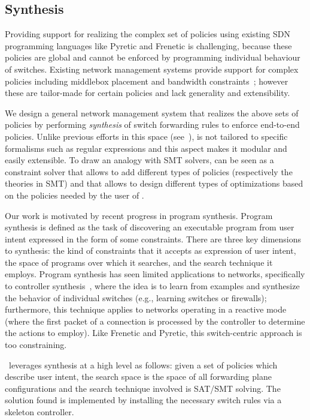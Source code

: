 \subsection{Synthesis} \label{sec:synthesis} 

Providing support for realizing the complex set of policies using
existing SDN programming languages like Pyretic and Frenetic is
challenging, because these policies are global and cannot be enforced
by programming individual behaviour of switches. Existing network
management systems provide support for complex policies including
middlebox placement and bandwidth constraints~\cite{}; however these
are tailor-made for certain policies and lack generality and
extensibility.

We design a general network management system that realizes the above
sets of policies by performing {\em synthesis} of switch forwarding
rules to enforce end-to-end policies. 
Unlike previous efforts in this space (see~\cite{}),
\Name is not tailored to 
specific formalisms such as regular expressions and
this aspect makes it modular  and easily extensible.
To draw an analogy with SMT solvers, 
\Name can be seen as a constraint solver
that allows to add different types of policies (respectively the theories in SMT) and
that allows to design different types of optimizations based on the 
policies needed by the user of \Name.

Our work is motivated by recent
progress in program synthesis.  
Program synthesis is defined as the task of discovering an executable
program from user intent expressed in the form of some
constraints. There are three key dimensions to synthesis: the kind of
constraints that it accepts as expression of user intent, the space of
programs over which it searches, and the search technique it
employs. Program synthesis has seen limited applications to networks,
specifically to controller synthesis~\cite{netegg}, where the idea is
to learn from examples and synthesize the behavior of individual
switches (e.g., learning switches or firewalls); furthermore, this
technique applies to networks operating in a reactive mode (where the
first packet of a connection is processed by the controller to
determine the actions to employ). Like Frenetic and Pyretic, this
switch-centric approach is too constraining.

\Name\ leverages synthesis at a high level as follows: given a set of
policies which describe user intent, the search space is the space of
all forwarding plane configurations and the search technique involved
is SAT/SMT solving. The solution found is implemented by installing
the necessary switch rules via a skeleton controller.

